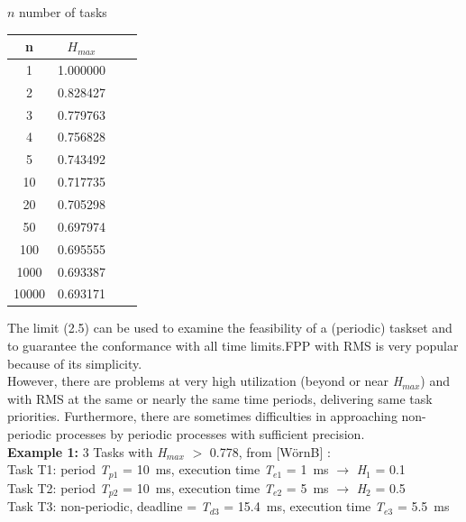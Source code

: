 $n$ number of tasks\\

\begin{table}[h!]
\setlength{\tabcolsep}{10pt} %
\renewcommand{\arraystretch}{1.5} %
\small
\centering
 \begin{tabular}{|c|c|c|c|} 
 \hline
 \textbf{n} & \textbf{$H_{max}$} \\ [0.1ex] \hline
1 & 1.000000 \\ \hline
2 & 0.828427 \\ \hline
3 & 0.779763 \\  \hline
4 & 0.756828 \\ \hline
5 & 0.743492 \\ \hline
10 & 0.717735 \\ \hline 
20 & 0.705298 \\ \hline 
50 & 0.697974 \\ \hline 
100 & 0.695555 \\ \hline 
1000 & 0.693387 \\ \hline 
10000 & 0.693171 \\ \hline 
 \end{tabular}
 \label{}
\end{table}

The limit (2.5) can be used to examine the feasibility of a (periodic) taskset and to guarantee the conformance with all time limits.FPP with RMS is very popular because of its simplicity. \\

However, there are problems at very high utilization (beyond or near \textit{H${}_{max}$}) and with RMS at the same or nearly the same time periods, delivering same task priorities. Furthermore, there are sometimes difficulties in approaching non-periodic processes by periodic processes with sufficient precision.\\

\textbf{Example 1:} 3 Tasks with \textit{H}${}_{max}$ $\mathrm{>}$ 0.778, from [W\"{o}rnB] : \\
Task T1: period \textit{T}${}_{p1}$ = 10~ms, execution time \textit{T}${}_{e1}$ = 1~ms $\rightarrow$ \textit{H}${}_{1}$ = 0.1\\
Task T2: period \textit{T}${}_{p2}$ = 10~ms, execution time\textit{ T}${}_{e2}$ = 5~ms $\rightarrow$ \textit{H}${}_{2}$ = 0.5\\
Task T3: non-periodic, deadline = \textit{T}${}_{d3}$ = 15.4~ms, execution time\textit{ T}${}_{e3}$ = 5.5~ms\\

